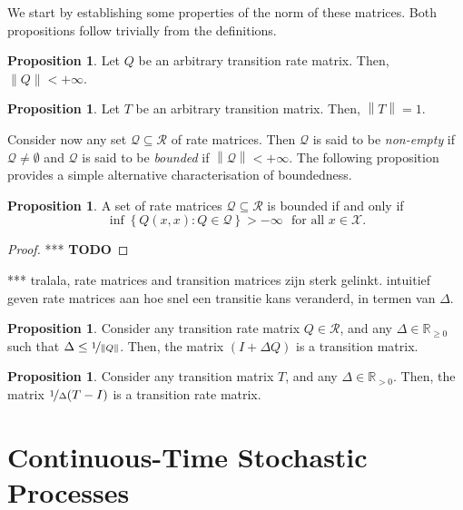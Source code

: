 \documentclass[10pt]{paper}
\theoremstyle{definition}
\newtheorem{proposition}[theorem]{Proposition}
\newcommand{\reals}{\mathbb{R}}
\newcommand{\realspos}{\reals_{>0}}
\newcommand{\realsnonneg}{\reals_{\geq 0}}
\newcommand{\states}{\mathcal{X}}
\newcommand{\rateset}{\mathcal{Q}}
\newcommand{\norm}[1]{\left\lVert #1 \right\rVert}
\begin{document}
\noindent We start by establishing some properties of the norm of these matrices. Both propositions follow trivially from the definitions.

\begin{proposition}
Let $Q$ be an arbitrary transition rate matrix. Then, $\norm{Q}<+\infty$.
\end{proposition}

\begin{proposition}
Let $T$ be an arbitrary transition matrix. Then, $\norm{T}=1$.
\end{proposition}

Consider now any set $\rateset\subseteq\mathcal{R}$ of rate matrices. Then $\rateset$ is said to be \emph{non-empty} if $\rateset\neq\emptyset$ and $\rateset$ is said to be \emph{bounded} if $\norm{\rateset}<+\infty$. The following proposition provides a simple alternative characterisation of boundedness.

\begin{proposition}\label{prop:alternativedefforbounded}
A set of rate matrices $\rateset\subseteq\mathcal{R}$ is bounded if and only if
\begin{equation*}
\inf\left\{Q(x,x)\colon Q\in\rateset\right\}>-\infty\text{~~for all $x\in\states$.}
\end{equation*}
\end{proposition}
\begin{proof}
*** {\bf TODO}
\end{proof}

*** tralala, rate matrices and transition matrices zijn sterk gelinkt.  intuitief geven rate matrices aan hoe snel een transitie kans veranderd, in termen van $\Delta$.

\begin{proposition}\label{prop:stochastic_from_rate_matrix}
Consider any transition rate matrix $Q\in\mathcal{R}$, and any $\Delta\in\realsnonneg$ such that $\Delta \leq \nicefrac{1}{\norm{Q}}$. Then, the matrix $(I+\Delta Q)$ is a transition matrix.
\end{proposition}

\begin{proposition}\label{prop:rate_from_stochastic_matrix}
Consider any transition matrix $T$, and any $\Delta\in\realspos$. Then, the matrix $\nicefrac{1}{\Delta}(T-I)$ is a transition rate matrix.
\end{proposition}

\section{Continuous-Time Stochastic Processes}\label{sec:stochastic_processes}
\end{document}
